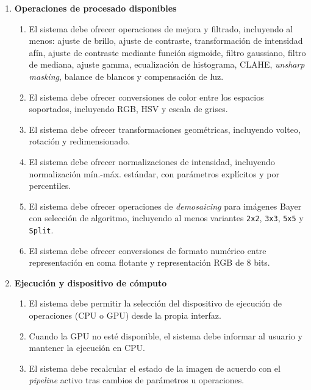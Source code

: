 \begin{enumerate}
	\item \textbf{Operaciones de procesado disponibles}\label{req:rf-5}
	\begin{enumerate}
		\item[5.1.] El sistema debe ofrecer operaciones de mejora y filtrado, incluyendo al menos: ajuste de brillo, ajuste de contraste, transformación de intensidad afín, ajuste de contraste mediante función sigmoide, filtro gaussiano, filtro de mediana, ajuste gamma, ecualización de histograma, CLAHE, \textit{unsharp masking}, balance de blancos y compensación de luz.\label{req:rf-5-1}
		\item[5.2.] El sistema debe ofrecer conversiones de color entre los espacios soportados, incluyendo RGB, HSV y escala de grises.\label{req:rf-5-2}
		\item[5.3.] El sistema debe ofrecer transformaciones geométricas, incluyendo volteo, rotación y redimensionado.\label{req:rf-5-3}
		\item[5.4.] El sistema debe ofrecer normalizaciones de intensidad, incluyendo normalización mín.-máx. estándar, con parámetros explícitos y por percentiles.\label{req:rf-5-4}
		\item[5.5.] El sistema debe ofrecer operaciones de \textit{demosaicing} para imágenes Bayer con selección de algoritmo, incluyendo al menos variantes \texttt{2x2}, \texttt{3x3}, \texttt{5x5} y \texttt{Split}.\label{req:rf-5-5}
		\item[5.6.] El sistema debe ofrecer conversiones de formato numérico entre representación en coma flotante y representación RGB de 8 bits.\label{req:rf-5-6}
	\end{enumerate}

	\newpage

	\item \textbf{Ejecución y dispositivo de cómputo}\label{req:rf-6}
	\begin{enumerate}
		\item[6.1.] El sistema debe permitir la selección del dispositivo de ejecución de operaciones (CPU o GPU) desde la propia interfaz.\label{req:rf-6-1}
		\item[6.2.] Cuando la GPU no esté disponible, el sistema debe informar al usuario y mantener la ejecución en CPU.\label{req:rf-6-2}
		\item[6.3.] El sistema debe recalcular el estado de la imagen de acuerdo con el \textit{pipeline} activo tras cambios de parámetros u operaciones.\label{req:rf-6-3}
	\end{enumerate}


\end{enumerate}

